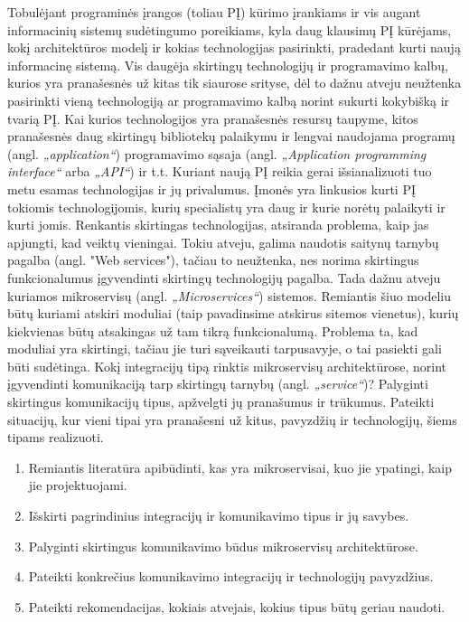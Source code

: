 
Tobulėjant programinės įrangos (toliau PĮ) kūrimo įrankiams ir vis augant informacinių sistemų sudėtingumo poreikiams, 
kyla daug klausimų PĮ kūrėjams, kokį architektūros modelį ir kokias technologijas pasirinkti, pradedant kurti naują informacinę sistemą.
Vis daugėja skirtingų technologijų ir programavimo kalbų, kurios yra pranašesnės už kitas tik siaurose srityse,
dėl to dažnu atveju neužtenka pasirinkti vieną technologiją ar programavimo kalbą norint sukurti kokybišką ir
tvarią PĮ. Kai kurios technologijos yra pranašesnės resursų taupyme, kitos pranašesnės daug skirtingų bibliotekų palaikymu ir lengvai naudojama
programų (angl. \textit{„application“}) programavimo sąsaja (angl. \textit{„Application programming interface“} arba \textit{„API“}) ir t.t.
Kuriant naują PĮ reikia gerai išsianalizuoti tuo metu esamas technologijas ir jų privalumus.
Įmonės yra linkusios kurti PĮ tokiomis technologijomis, kurių specialistų yra daug ir kurie norėtų palaikyti ir kurti jomis.
Renkantis skirtingas technologijas, atsiranda problema, kaip jas apjungti, kad veiktų vieningai.
Tokiu atveju, galima naudotis saitynų tarnybų pagalba (angl. "Web services"), tačiau to neužtenka,
nes norima skirtingus funkcionalumus įgyvendinti skirtingų technologijų pagalba.
Tada dažnu atveju kuriamos mikroservisų (angl. \textit{„Microservices“}) sistemos. Remiantis šiuo modeliu būtų kuriami atskiri moduliai (taip pavadinsime atskirus sitemos vienetus), kurių
kiekvienas būtų atsakingas už tam tikrą funkcionalumą. Problema ta, kad moduliai yra skirtingi, tačiau jie turi sąveikauti tarpusavyje, o tai pasiekti gali būti sudėtinga.  
Kokį integracijų tipą rinktis mikroservisų architektūrose, norint įgyvendinti komunikaciją tarp skirtingų tarnybų (angl. \textit{„service“})?
Palyginti skirtingus komunikacijų tipus, apžvelgti jų pranašumus ir trūkumus. Pateikti situacijų, kur vieni tipai yra pranašesni už kitus, pavyzdžių 
ir technologijų, šiems tipams realizuoti.
\begin{enumerate}
	\item Remiantis literatūra apibūdinti, kas yra mikroservisai, kuo jie ypatingi, kaip jie projektuojami.
	\item Išskirti pagrindinius integracijų ir komunikavimo tipus ir jų savybes.
	\item Palyginti skirtingus komunikavimo būdus mikroservisų architektūrose.
	\item Pateikti konkrečius komunikavimo integracijų ir technologijų pavyzdžius.
	\item Pateikti rekomendacijas, kokiais atvejais, kokius tipus būtų geriau naudoti.
\end{enumerate}

